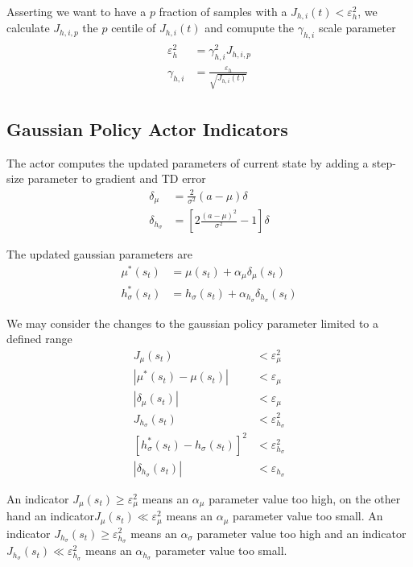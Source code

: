 \documentclass[]{article}
\begin{document}
Asserting we want to have a $ p $ fraction of samples with a $ J_{h,i}(t) < \varepsilon_h^2 $, we calculate $ J_{h, i, p} $ the $ p $ centile of $ J_{h, i}(t) $ and comupute the $ \gamma_{h,i} $ scale parameter
\begin{align}
\begin{split}
	\varepsilon_h^2&	= \gamma_{h,i}^2 J_{h,i,p}
	\\
	\gamma_{h,i}&			= \frac{\varepsilon_h}{\sqrt{J_{h,i}(t)}}
\end{split}
\end{align}

\subsection{Gaussian Policy Actor Indicators}

The actor computes the updated parameters of current state by adding a step-size parameter to gradient and TD error
\begin{align*}
	\delta_\mu&		= \frac{2}{\sigma^2}(a - \mu) \delta
	\\
	\delta_{h_\sigma}&	= \left[
		2\frac{(a - \mu)^2}{\sigma^2} - 1
	\right] \delta
\end{align*}

The updated gaussian parameters are
\begin{align*}
	\mu^*(s_t)&		= \mu(s_t) + \alpha_\mu \delta_\mu(s_t)
	\\
	h_\sigma^*(s_t)&	= h_\sigma(s_t) + \alpha_{h_\sigma}\delta_{h_\sigma}(s_t)
\end{align*}

We may consider the changes to the gaussian policy parameter limited to a defined range
\begin{align*}
	J_\mu(s_t)&								< \varepsilon^2_\mu
	\\
	|\mu^*(s_t) - \mu(s_t)|&				< \varepsilon_\mu
	\\
	|\delta_\mu(s_t)|&						< \varepsilon_\mu
	\\
	J_{h_\sigma}(s_t)&						< \varepsilon^2_{h_\sigma}
	\\
	[h_\sigma^*(s_t) - h_\sigma(s_t)]^2&	< \varepsilon^2_{h_\sigma}
	\\
	|\delta_{h_\sigma}(s_t)|&				< \varepsilon_{h_\sigma}
\end{align*}

An indicator $ J_\mu(s_t) \ge \varepsilon_\mu^2 $ means an $ \alpha_\mu $ parameter value too high, on the other hand an indicator$ J_\mu(s_t) \ll \varepsilon_\mu^2 $ means an $ \alpha_\mu $ parameter value too small.
An indicator $ J_{h_\sigma}(s_t) \ge \varepsilon_{h_\sigma}^2 $ means an $ \alpha_\sigma $ parameter value too high and an indicator $ J_{h_\sigma}(s_t) \ll \varepsilon_{h_\sigma}^2 $ means an $ \alpha_{h_\sigma} $ parameter value too small.
\end{document}
